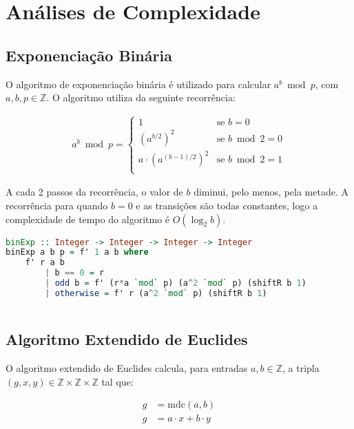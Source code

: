 \documentclass{article}
\begin{document}
\section{Análises de Complexidade}

\subsection{Exponenciação Binária}
\label{binExp}

O algoritmo de exponenciação binária é utilizado para calcular $a^b \bmod p$, com $a, b, p \in \mathbb{Z}$. O algoritmo utiliza da seguinte recorrência:

\begin{align*}
  a^b \bmod p = \begin{cases}
    1 & \text{se } b = 0 \\
    {(a^{b/2})}^2 & \text{se } b \bmod 2 = 0 \\
    a \cdot {(a^{(b-1)/2})}^2 & \text{se } b \bmod 2 = 1 \\
\end{cases}
\end{align*}

A cada 2 passos da recorrência, o valor de $b$ diminui, pelo menos, pela metade. A recorrência para quando $b = 0$ e as transições são todas constantes, logo a complexidade de tempo do algoritmo é $O(\log_2 b)$.

\begin{minipage}{.9\linewidth}
\begin{lstlisting}[language=haskell,caption=Exponenciação Binária]
binExp :: Integer -> Integer -> Integer -> Integer
binExp a b p = f' 1 a b where
    f' r a b
        | b == 0 = r
        | odd b = f' (r*a `mod` p) (a^2 `mod` p) (shiftR b 1)
        | otherwise = f' r (a^2 `mod` p) (shiftR b 1)
    
\end{lstlisting}
\end{minipage}    

\subsection{Algoritmo Extendido de Euclides}

O algoritmo extendido de Euclides calcula, para entradas $a, b \in \mathbb{Z}$, a tripla $(g, x, y) \in \mathbb{Z} \times \mathbb{Z} \times \mathbb{Z}$ tal que:

\begin{align*}
  g & = \text{mdc}(a, b) \\
  g & = a \cdot x + b \cdot y \\
\end{align*}
\end{document}
